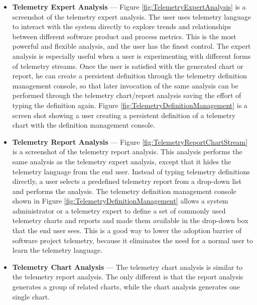 \begin{itemize}
	\item \textbf{Telemetry Expert Analysis} --- 
Figure \ref{fig:TelemetryExpertAnalysis} is a screenshot of the telemetry expert analysis. The user uses telemetry language to interact with the system directly to explore trends and relationships between different software product and process metrics. This is the most powerful and flexible analysis, and the user has the finest control.
The expert analysis is especially useful when a user is experimenting with different forms of telemetry streams. Once the user is satisfied with the generated chart or report, he can create a persistent definition through the telemetry definition management console, so that later invocation of the same analysis can be performed through the telemetry chart/report analysis saving the effort of typing the definition again. Figure \ref{fig:TelemetryDefinitionManagement} is a screen shot showing a user creating a persistent definition of a telemetry chart with the definition management console.
	
	\item \textbf{Telemetry Report Analysis} --- 
Figure \ref{fig:TelemetryReportChartStream} is a screenshot of the telemetry report analysis.
This analysis performs the same analysis as the telemetry expert analysis, except that it hides the telemetry language from the end user. Instead of typing telemetry definitions directly, a user selects a predefined telemetry report from a drop-down list and performs the analysis.
The telemetry definition management console shown in Figure \ref{fig:TelemetryDefinitionManagement} allows a system administrator or a telemetry expert to define a set of commonly used telemetry charts and reports and made them available in the drop-down box that the end user sees.	This is a good way to lower the adoption barrier of software project telemetry, because it eliminates the need for a normal user to learn the telemetry language.
	
	\item \textbf{Telemetry Chart Analysis} ---
The telemetry chart analysis is similar to the telemetry report analysis. The only different is that the report analysis generates a group of related charts, while the chart analysis generates one single chart.

\end{itemize}








